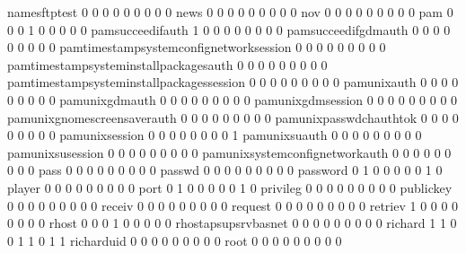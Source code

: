 \documentclass[compress,8pt]{beamer}
\begin{document}
\begin{frame}
\begin{Schunk}
  namesftptest                               0   0   0   0   0   0   0   0   0
  news                                       0   0   0   0   0   0   0   0   0
  nov                                        0   0   0   0   0   0   0   0   0
  pam                                        0   0   0   1   0   0   0   0   0
  pamsucceedifauth                           1   0   0   0   0   0   0   0   0
  pamsucceedifgdmauth                        0   0   0   0   0   0   0   0   0
  pamtimestampsystemconfignetworksession     0   0   0   0   0   0   0   0   0
  pamtimestampsysteminstallpackagesauth      0   0   0   0   0   0   0   0   0
  pamtimestampsysteminstallpackagessession   0   0   0   0   0   0   0   0   0
  pamunixauth                                0   0   0   0   0   0   0   0   0
  pamunixgdmauth                             0   0   0   0   0   0   0   0   0
  pamunixgdmsession                          0   0   0   0   0   0   0   0   0
  pamunixgnomescreensaverauth                0   0   0   0   0   0   0   0   0
  pamunixpasswdchauthtok                     0   0   0   0   0   0   0   0   0
  pamunixsession                             0   0   0   0   0   0   0   0   1
  pamunixsuauth                              0   0   0   0   0   0   0   0   0
  pamunixsusession                           0   0   0   0   0   0   0   0   0
  pamunixsystemconfignetworkauth             0   0   0   0   0   0   0   0   0
  pass                                       0   0   0   0   0   0   0   0   0
  passwd                                     0   0   0   0   0   0   0   0   0
  password                                   0   1   0   0   0   0   0   1   0
  player                                     0   0   0   0   0   0   0   0   0
  port                                       0   1   0   0   0   0   0   1   0
  privileg                                   0   0   0   0   0   0   0   0   0
  publickey                                  0   0   0   0   0   0   0   0   0
  receiv                                     0   0   0   0   0   0   0   0   0
  request                                    0   0   0   0   0   0   0   0   0
  retriev                                    1   0   0   0   0   0   0   0   0
  rhost                                      0   0   0   1   0   0   0   0   0
  rhostapsupsrvbasnet                        0   0   0   0   0   0   0   0   0
  richard                                    1   1   0   0   1   1   0   1   1
  richarduid                                 0   0   0   0   0   0   0   0   0
  root                                       0   0   0   0   0   0   0   0   0

\end{Schunk}
\end{frame}
\end{document}
